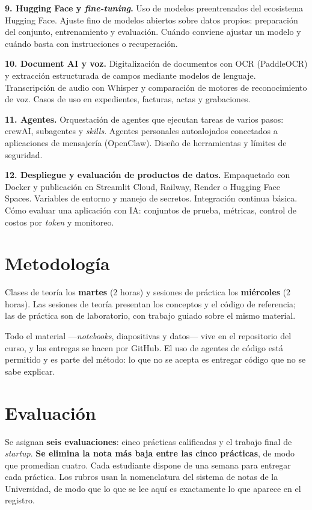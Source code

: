 \documentclass[11pt]{article}
\begin{document}
\textbf{9. Hugging Face y \emph{fine-tuning}.}
Uso de modelos preentrenados del ecosistema Hugging Face. Ajuste fino de modelos abiertos sobre datos propios: preparaci\'on del conjunto, entrenamiento y evaluaci\'on. Cu\'ando conviene ajustar un modelo y cu\'ando basta con instrucciones o recuperaci\'on.

\textbf{10. Document AI y voz.}
Digitalizaci\'on de documentos con OCR (PaddleOCR) y extracci\'on estructurada de campos mediante modelos de lenguaje. Transcripci\'on de audio con Whisper y comparaci\'on de motores de reconocimiento de voz. Casos de uso en expedientes, facturas, actas y grabaciones.

\textbf{11. Agentes.}
Orquestaci\'on de agentes que ejecutan tareas de varios pasos: crewAI, subagentes y \emph{skills}. Agentes personales autoalojados conectados a aplicaciones de mensajer\'ia (OpenClaw). Dise\~no de herramientas y l\'imites de seguridad.

\textbf{12. Despliegue y evaluaci\'on de productos de datos.}
Empaquetado con Docker y publicaci\'on en Streamlit Cloud, Railway, Render o Hugging Face Spaces. Variables de entorno y manejo de secretos. Integraci\'on continua b\'asica. C\'omo evaluar una aplicaci\'on con IA: conjuntos de prueba, m\'etricas, control de costos por \emph{token} y monitoreo.

\section{Metodolog\'ia}

Clases de teor\'ia los \textbf{martes} (2 horas) y sesiones de pr\'actica los \textbf{mi\'ercoles} (2 horas). Las sesiones de teor\'ia presentan los conceptos y el c\'odigo de referencia; las de pr\'actica son de laboratorio, con trabajo guiado sobre el mismo material.

Todo el material ---\emph{notebooks}, diapositivas y datos--- vive en el repositorio del curso, y las entregas se hacen por GitHub. El uso de agentes de c\'odigo est\'a permitido y es parte del m\'etodo: lo que no se acepta es entregar c\'odigo que no se sabe explicar.

\section{Evaluaci\'on}

Se asignan \textbf{seis evaluaciones}: cinco pr\'acticas calificadas y el trabajo final de \emph{startup}. \textbf{Se elimina la nota m\'as baja entre las cinco pr\'acticas}, de modo que promedian cuatro. Cada estudiante dispone de una semana para entregar cada pr\'actica. Los rubros usan la nomenclatura del sistema de notas de la Universidad, de modo que lo que se lee aqu\'i es exactamente lo que aparece en el registro.
\end{document}
